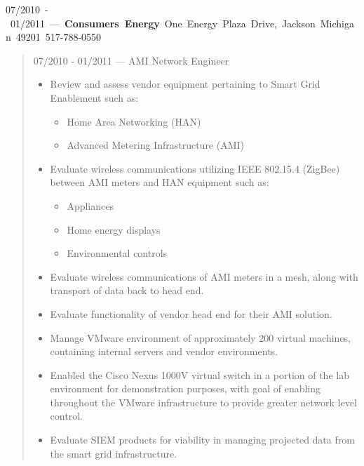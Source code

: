 \mbox{07/2010 - 01/2011 --- {\bf Consumers Energy} One Energy Plaza Drive, Jackson Michigan 49201 517-788-0550}
\begin{quote}
07/2010 - 01/2011 --- AMI Network Engineer\\
\begin{itemize}
\item Review and assess vendor equipment pertaining to Smart Grid Enablement
such as:
\begin{itemize}
\item Home Area Networking (HAN)
\item Advanced Metering Infrastructure (AMI)
\end{itemize}
\item Evaluate wireless communications utilizing IEEE 802.15.4 (ZigBee)
between AMI meters and HAN equipment such as:
\begin{itemize}
\item Appliances
\item Home energy displays
\item Environmental controls
\end{itemize}
\item Evaluate wireless communications of AMI meters in a mesh, along with
transport of data back to head end.
\item Evaluate functionality of vendor head end for their AMI solution.
\item Manage VMware environment of approximately 200 virtual machines,
containing internal servers and vendor environments.
\item Enabled the Cisco Nexus 1000V virtual switch in a portion of the lab
environment for demonstration purposes, with goal of enabling throughout
the VMware infrastructure to provide greater network level control.
\item Evaluate SIEM products for viability in managing projected data from the
smart grid infrastructure.
\end{itemize}
\end{quote}
